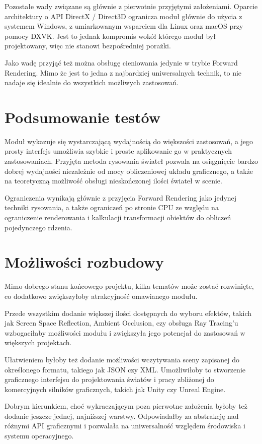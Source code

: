 Pozostałe wady związane są głównie z pierwotnie przyjętymi założeniami. Oparcie architektury o API DirectX / Direct3D ogranicza moduł głównie do użycia z systemem Windows, z umiarkowanym wsparciem dla Linux oraz macOS przy pomocy DXVK. Jest to jednak kompromis wokół którego moduł był projektowany, więc nie stanowi bezpośredniej porażki. 

Jako wadę przyjąć też można obsługę cieniowania jedynie w trybie Forward Rendering. Mimo że jest to jedna z najbardziej uniwersalnych technik, to nie nadaje się idealnie do wszystkich możliwych zastosowań.

\section{Podsumowanie testów}
Moduł wykazuje się wystarczającą wydajnością do większości zastosowań, a jego prosty interfejs umożliwia szybkie i proste aplikowanie go w praktycznych zastosowaniach. Przyjęta metoda rysowania świateł pozwala na osiągnięcie bardzo dobrej wydajności niezależnie od mocy obliczeniowej układu graficznego, a także na teoretyczną możliwość obsługi nieskończonej ilości świateł w scenie. 

Ograniczenia wynikają głównie z przyjęcia Forward Rendering jako jedynej techniki rysowania, a także ograniczeń po stronie CPU ze względu na ograniczenie renderowania i kalkulacji transformacji obiektów do obliczeń pojedynczego rdzenia. 

\section{Możliwości rozbudowy}
Mimo dobrego stanu końcowego projektu, kilka tematów może zostać rozwinięte, co dodatkowo zwiększyłoby atrakcyjność omawianego modułu. 

Przede wszystkim dodanie większej ilości dostępnych do wyboru efektów, takich jak Screen Space Reflection, Ambient Occlusion, czy obsługa Ray Tracing'u wzbogaciłaby możliwości modułu i zwiększyła jego potencjał do zastosowań w większych projektach. 

Ułatwieniem byłoby też dodanie możliwości wczytywania sceny zapisanej do określonego formatu, takiego jak JSON czy XML. Umożliwiłoby to stworzenie graficznego interfejsu do projektowania światów i pracy zbliżonej do komercyjnych silników graficznych, takich jak Unity czy Unreal Engine.

Dobrym kierunkiem, choć wykraczającym poza pierwotne założenia byłoby też dodanie jeszcze jednej, najniższej warstwy. Odpowiadałby za abstrakcję nad różnymi API graficznymi i pozwalała na uniwersalność względem środowiska i systemu operacyjnego. 